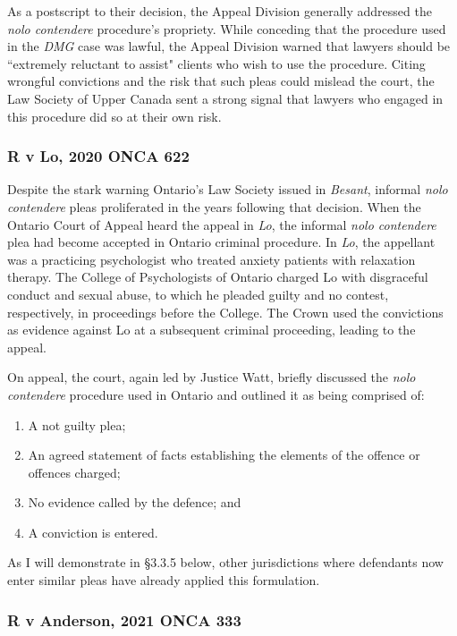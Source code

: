 As a postscript to their decision, the Appeal Division generally addressed the \textit{nolo contendere} procedure's propriety. While conceding that the procedure used in the \textit{DMG} case was lawful, the Appeal Division warned that lawyers should be ``extremely reluctant to assist" clients who wish to use the procedure. Citing wrongful convictions and the risk that such pleas could mislead the court, the Law Society of Upper Canada sent a strong signal that lawyers who engaged in this procedure did so at their own risk.

\subsubsection{R v Lo, 2020 ONCA 622}

Despite the stark warning Ontario's Law Society issued in \textit{Besant}, informal \textit{nolo contendere} pleas proliferated in the years following that decision. When the Ontario Court of Appeal heard the appeal in \textit{Lo}, the informal \textit{nolo contendere} plea had become accepted in Ontario criminal procedure. In \textit{Lo}, the appellant was a practicing psychologist who treated anxiety patients with relaxation therapy. The College of Psychologists of Ontario charged Lo with disgraceful conduct and sexual abuse, to which he pleaded guilty and no contest, respectively, in proceedings before the College. The Crown used the convictions as evidence against Lo at a subsequent criminal proceeding, leading to the appeal.

On appeal, the court, again led by Justice Watt, briefly discussed the \textit{nolo contendere} procedure used in Ontario and outlined it as being comprised of:

\begin{enumerate}
    \item A not guilty plea;
    \item An agreed statement of facts establishing the elements of the offence or offences charged;
    \item No evidence called by the defence; and
    \item A conviction is entered.
\end{enumerate}

As I will demonstrate in §3.3.5 below, other jurisdictions where defendants now enter similar pleas have already applied this formulation.

\subsubsection{R v Anderson, 2021 ONCA 333}


